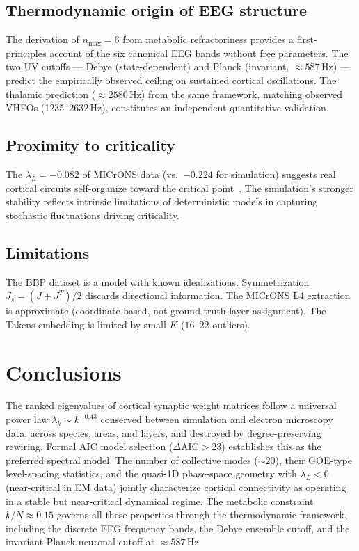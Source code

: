 \documentclass[aps,pre,twocolumn,showpacs,superscriptaddress,longbibliography]{revtex4-2}
\newcommand{\kN}{k/N}
\begin{document}
\subsection{Thermodynamic origin of EEG structure}

The derivation of $n_{\max}=6$ from metabolic refractoriness
provides a first-principles account of the six canonical EEG
bands without free parameters. The two UV cutoffs --- Debye
(state-dependent) and Planck (invariant, $\approx 587\,\mathrm{Hz}$)
--- predict the empirically observed ceiling on sustained cortical
oscillations. The thalamic prediction ($\approx 2580\,\mathrm{Hz}$)
from the same framework, matching observed VHFOs (1235--2632\,Hz),
constitutes an independent quantitative validation.

\subsection{Proximity to criticality}

The $\lambda_L = -0.082$ of MICrONS data (vs.\ $-0.224$ for
simulation) suggests real cortical circuits self-organize toward
the critical point~\cite{Beggs2003,Plenz2007}. The simulation's
stronger stability reflects intrinsic limitations of deterministic
models in capturing stochastic fluctuations driving criticality.

\subsection{Limitations}

The BBP dataset is a model with known idealizations.
Symmetrization $J_s = (J+J^T)/2$ discards directional information.
The MICrONS L4 extraction is approximate (coordinate-based, not
ground-truth layer assignment). The Takens embedding is limited
by small $K$ ($16$--$22$ outliers).

\section{\label{sec:conclusions}Conclusions}

The ranked eigenvalues of cortical synaptic weight matrices follow
a universal power law $\lambda_k \sim k^{-0.43}$ conserved between
simulation and electron microscopy data, across species, areas,
and layers, and destroyed by degree-preserving rewiring.
Formal AIC model selection ($\Delta\mathrm{AIC} > 23$) establishes
this as the preferred spectral model. The number of collective modes
($\sim 20$), their GOE-type level-spacing statistics, and the
quasi-1D phase-space geometry with $\lambda_L < 0$ (near-critical
in EM data) jointly characterize cortical connectivity as operating
in a stable but near-critical dynamical regime.
The metabolic constraint $\kN \approx 0.15$ governs all these
properties through the thermodynamic framework, including the
discrete EEG frequency bands, the Debye ensemble cutoff, and the
invariant Planck neuronal cutoff at $\approx 587\,\mathrm{Hz}$.
\end{document}
